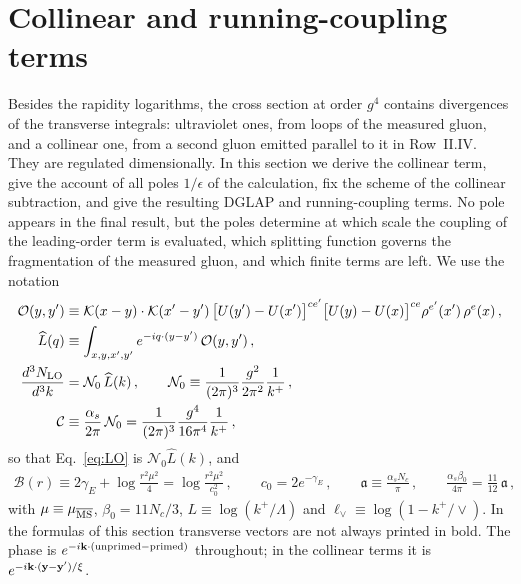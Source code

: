 \section{Collinear and running-coupling terms}\label{sec:dglap_rc}

Besides the rapidity logarithms, the cross section at order $g^4$ contains divergences of the transverse integrals: ultraviolet ones, from loops of the measured gluon, and a collinear one, from a second gluon emitted parallel to it in Row~II.IV. They are regulated dimensionally. In this section we derive the collinear term, give the account of all poles $1/\epsilon$ of the calculation, fix the scheme of the collinear subtraction, and give the resulting DGLAP and running-coupling terms. No pole appears in the final result, but the poles determine at which scale the coupling of the leading-order term is evaluated, which splitting function governs the fragmentation of the measured gluon, and which finite terms are left. We use the notation
\begin{align}\label{eq:dg_not}
\mathcal O(y,y')&\equiv\mathcal{K}(x-y)\cdot\mathcal{K}(x'-y')\,\big[U(y')-U(x')\big]^{ce'}\big[U(y)-U(x)\big]^{ce}\rho^{e'}(x')\,\rho^{e}(x)\,,\notag\\
\widehat L(q)&\equiv\int_{x,y,x',y'}e^{-iq\cdot(y-y')}\,\mathcal O(y,y')\,,\notag\\
\frac{d^3N_{\rm LO}}{d^3k}&=\mathcal N_0\,\widehat L(k)\,,\qquad
\mathcal N_0\equiv\frac{1}{(2\pi)^3}\frac{g^2}{2\pi^2}\frac{1}{k^+}\,,\notag\\
\mathcal C&\equiv\frac{\alpha_s}{2\pi}\,\mathcal N_0=\frac{1}{(2\pi)^3}\frac{g^4}{16\pi^4}\frac{1}{k^+}\,,
\end{align}
so that Eq.~\eqref{eq:LO} is $\mathcal N_0\widehat L(k)$, and
\begin{align}\label{eq:dg_B}
\mathcal B(r)\equiv2\gamma_E+\log\frac{r^2\mu^2}{4}=\log\frac{r^2\mu^2}{c_0^2}\,,\qquad c_0=2e^{-\gamma_E}\,,\qquad
\mathfrak a\equiv\frac{\alpha_sN_c}{\pi}\,,\qquad \frac{\alpha_s\beta_0}{4\pi}=\frac{11}{12}\,\mathfrak a\,,
\end{align}
with $\mu\equiv\mu_{\overline{\rm MS}}$, $\beta_0=11N_c/3$, $L\equiv\log(k^+/\Lambda)$ and $\ell_\vee\equiv\log(1-k^+/\vee)$. In the formulas of this section transverse vectors are not always printed in bold. The phase is $e^{-i\mathbf{k}\cdot(\text{unprimed}-\text{primed})}$ throughout; in the collinear terms it is $e^{-i\mathbf{k}\cdot(\mathbf{y}-\mathbf{y}')/\xi}$.

